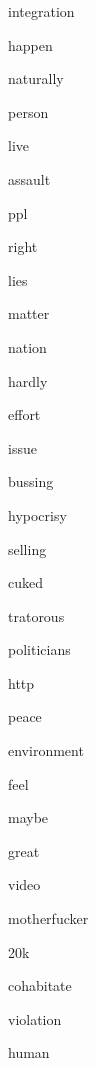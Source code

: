 \documentclass[varwidth]{standalone}
\begin{document}
\begin{CJK*}{UTF8}{gbsn}
{{{\colorbox{red!8.259529113769531}{\strut integration}
\colorbox{red!10.905210494995117}{\strut happen}
\colorbox{red!6.307920455932617}{\strut naturally}
\colorbox{red!7.016772270202637}{\strut person}
\colorbox{red!6.3792877197265625}{\strut live}
\colorbox{red!6.126198768615723}{\strut assault}
\colorbox{red!12.979729652404785}{\strut ppl}
\colorbox{red!9.647311210632324}{\strut right}
\colorbox{red!7.53249454498291}{\strut lies}
\colorbox{red!8.867199897766113}{\strut matter}
\colorbox{red!6.579433441162109}{\strut nation}
\colorbox{red!6.597114086151123}{\strut hardly}
\colorbox{red!9.578998565673828}{\strut effort}
\colorbox{red!9.801569938659668}{\strut issue}
\colorbox{red!9.414434432983398}{\strut bussing}
\colorbox{red!14.472090721130371}{\strut hypocrisy}
\colorbox{red!8.780232429504395}{\strut selling}
\colorbox{red!14.808116912841797}{\strut cuked}
\colorbox{red!12.564571380615234}{\strut tratorous}
\colorbox{red!2.228114366531372}{\strut politicians}
\colorbox{red!8.33220100402832}{\strut http}
\colorbox{red!9.42543888092041}{\strut peace}
\colorbox{red!11.488175392150879}{\strut environment}
\colorbox{red!8.030982971191406}{\strut feel}
\colorbox{red!11.117019653320312}{\strut maybe}
\colorbox{red!8.751059532165527}{\strut great}
\colorbox{red!8.912144660949707}{\strut video}
\colorbox{red!13.207674026489258}{\strut motherfucker}
\colorbox{red!11.147235870361328}{\strut 20k}
\colorbox{red!11.632085800170898}{\strut cohabitate}
\colorbox{red!4.8537187576293945}{\strut violation}
\colorbox{red!7.364881992340088}{\strut human}

}}}
\end{CJK*}
\end{document}
